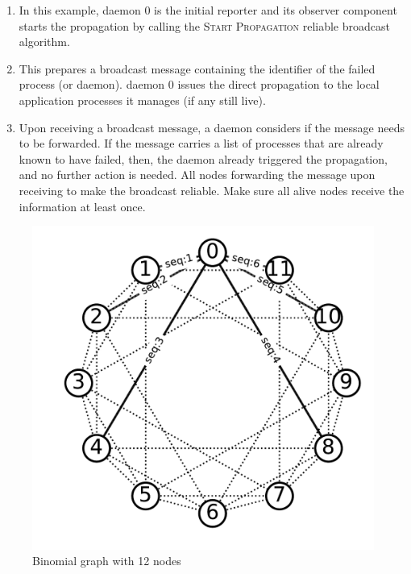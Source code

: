 \documentclass[sigconf]{acmart}
\begin{document}
\begin{enumerate}
 \item In this example, daemon 0 is the initial reporter and its observer component starts the propagation by calling the \textsc{Start Propagation} reliable broadcast algorithm.
 \item This prepares a broadcast message containing the identifier of the 
 failed process (or daemon). daemon 0 issues the direct propagation to the local application processes it manages (if any still live).
 \item Upon receiving a broadcast message, a daemon considers if the message needs 
 to be forwarded. If the message carries a list of processes that are already known to
 have failed, then, the daemon already triggered the propagation, and no further 
 action is needed. 
 All nodes forwarding the message upon receiving to make the broadcast reliable. Make sure all alive nodes receive the information at least once. 
\end{enumerate}






\begin{figure}
  \centering
  \includegraphics[width=\linewidth]{BMG_seq.pdf}
  \caption{Binomial graph with 12 nodes}
  \label{fig:bmg}
\end{figure}
\end{document}
